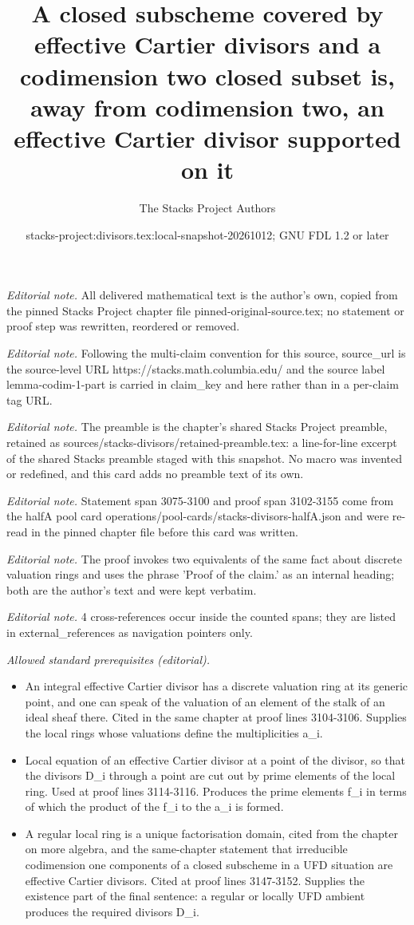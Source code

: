 \documentclass[10pt,a4paper]{amsart}
\title{A closed subscheme covered by effective Cartier divisors and a codimension two closed subset is, away from codimension two, an effective Cartier divisor supported on it}
\author{The Stacks Project Authors}
\date{stacks-project:divisors.tex:local-snapshot-20261012; GNU FDL 1.2 or later}
\theoremstyle{plain}
\theoremstyle{definition}
\theoremstyle{remark}
\numberwithin{equation}{subsection}
\begin{document}
\maketitle
\noindent\textit{Editorial note.} All delivered mathematical text is the author's own, copied from the pinned Stacks Project chapter file pinned-original-source.tex; no statement or proof step was rewritten, reordered or removed.\par\medskip
\noindent\textit{Editorial note.} Following the multi-claim convention for this source, source\_url is the source-level URL https://stacks.math.columbia.edu/ and the source label lemma-codim-1-part is carried in claim\_key and here rather than in a per-claim tag URL.\par\medskip
\noindent\textit{Editorial note.} The preamble is the chapter's shared Stacks Project preamble, retained as sources/stacks-divisors/retained-preamble.tex: a line-for-line excerpt of the shared Stacks preamble staged with this snapshot. No macro was invented or redefined, and this card adds no preamble text of its own.\par\medskip
\noindent\textit{Editorial note.} Statement span 3075-3100 and proof span 3102-3155 come from the halfA pool card operations/pool-cards/stacks-divisors-halfA.json and were re-read in the pinned chapter file before this card was written.\par\medskip
\noindent\textit{Editorial note.} The proof invokes two equivalents of the same fact about discrete valuation rings and uses the phrase 'Proof of the claim.' as an internal heading; both are the author's text and were kept verbatim.\par\medskip
\noindent\textit{Editorial note.} 4 cross-references occur inside the counted spans; they are listed in external\_references as navigation pointers only.\par\medskip
\noindent\textit{Allowed standard prerequisites (editorial).}\begin{itemize}
\item An integral effective Cartier divisor has a discrete valuation ring at its generic point, and one can speak of the valuation of an element of the stalk of an ideal sheaf there. Cited in the same chapter at proof lines 3104-3106. Supplies the local rings whose valuations define the multiplicities a\_i.
\item Local equation of an effective Cartier divisor at a point of the divisor, so that the divisors D\_i through a point are cut out by prime elements of the local ring. Used at proof lines 3114-3116. Produces the prime elements f\_i in terms of which the product of the f\_i to the a\_i is formed.
\item A regular local ring is a unique factorisation domain, cited from the chapter on more algebra, and the same-chapter statement that irreducible codimension one components of a closed subscheme in a UFD situation are effective Cartier divisors. Cited at proof lines 3147-3152. Supplies the existence part of the final sentence: a regular or locally UFD ambient produces the required divisors D\_i.
\end{itemize}\medskip
\end{document}
